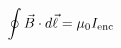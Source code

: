 \documentclass[preview]{standalone}
\begin{document}
\begin{align*}
\special{dvisvgm:raw <g id='unique000'>}\oint \vec{B}\cdot d\vec{\ell}=\mu_0 I_{\mathrm{enc}}\special{dvisvgm:raw </g>}
\end{align*}
\end{document}
